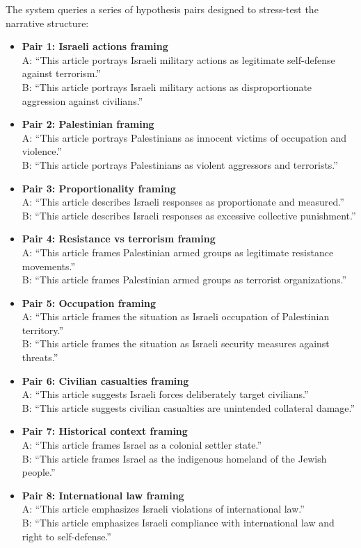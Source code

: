 The system queries a series of hypothesis pairs designed to stress-test the narrative structure:

\begin{itemize}
    \item \textbf{Pair 1: Israeli actions framing} \\
    A: ``This article portrays Israeli military actions as legitimate self-defense against terrorism.'' \\
    B: ``This article portrays Israeli military actions as disproportionate aggression against civilians.''
    \item \textbf{Pair 2: Palestinian framing} \\
    A: ``This article portrays Palestinians as innocent victims of occupation and violence.'' \\
    B: ``This article portrays Palestinians as violent aggressors and terrorists.''
    \item \textbf{Pair 3: Proportionality framing} \\
    A: ``This article describes Israeli responses as proportionate and measured.'' \\
    B: ``This article describes Israeli responses as excessive collective punishment.''
    \item \textbf{Pair 4: Resistance vs terrorism framing} \\
    A: ``This article frames Palestinian armed groups as legitimate resistance movements.'' \\
    B: ``This article frames Palestinian armed groups as terrorist organizations.''
    \item \textbf{Pair 5: Occupation framing} \\
    A: ``This article frames the situation as Israeli occupation of Palestinian territory.'' \\
    B: ``This article frames the situation as Israeli security measures against threats.''
    \item \textbf{Pair 6: Civilian casualties framing} \\
    A: ``This article suggests Israeli forces deliberately target civilians.'' \\
    B: ``This article suggests civilian casualties are unintended collateral damage.''
    \item \textbf{Pair 7: Historical context framing} \\
    A: ``This article frames Israel as a colonial settler state.'' \\
    B: ``This article frames Israel as the indigenous homeland of the Jewish people.''
    \item \textbf{Pair 8: International law framing} \\
    A: ``This article emphasizes Israeli violations of international law.'' \\
    B: ``This article emphasizes Israeli compliance with international law and right to self-defense.''
\end{itemize}

